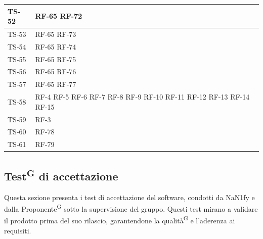 \documentclass[8pt]{article}
\newcommand{\glossterm}[1]{#1\textsuperscript{G}} %
\begin{document}
\begin{longtable}{|>{\centering}p{4cm}|>{\centering\arraybackslash}p{4cm}|}
    \hline
    TS-52 & RF-65 \newline
            RF-72 \\
    \hline
    TS-53 & RF-65 \newline
            RF-73 \\
    \hline
    TS-54 & RF-65 \newline
            RF-74 \\
    \hline
    TS-55 & RF-65 \newline
            RF-75 \\
    \hline
    TS-56 & RF-65 \newline
            RF-76 \\
    \hline
    TS-57 & RF-65 \newline
            RF-77 \\
    \hline
    TS-58 & RF-4 \newline
            RF-5 \newline
            RF-6 \newline
            RF-7 \newline
            RF-8 \newline
            RF-9 \newline
            RF-10 \newline
            RF-11 \newline
            RF-12 \newline
            RF-13 \newline
            RF-14 \newline
            RF-15 \\
    \hline
    TS-59 & RF-3 \\
    \hline
    TS-60 & RF-78 \\
    \hline
    TS-61 & RF-79 \\
    \hline
\end{longtable}
\clearpage
\subsection{\glossterm{Test} di accettazione}\label{sec:test accettazione}
Questa sezione presenta i test di accettazione del software, condotti da NaN1fy e dalla
\glossterm{Proponente} sotto la supervisione del gruppo. Questi test mirano a validare il prodotto prima del suo rilascio, garantendone la \glossterm{qualità} e l'aderenza ai requisiti.
\end{document}
